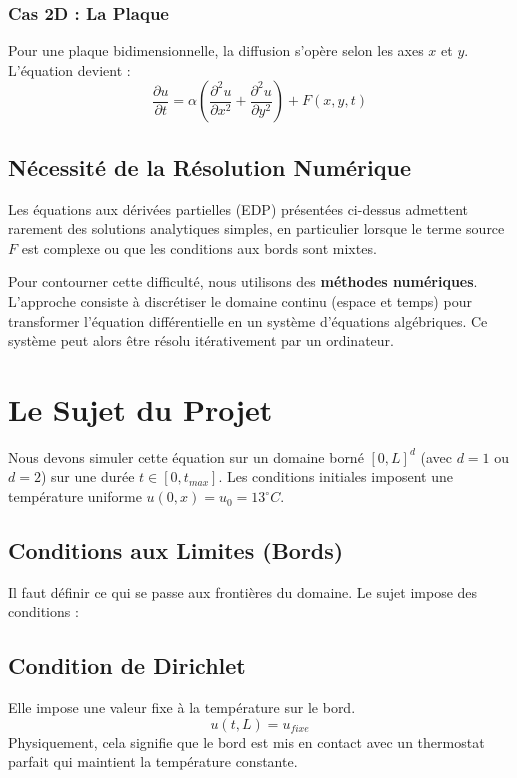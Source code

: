 \documentclass[a4paper,12pt]{article}
\begin{document}
\subsubsection{Cas 2D : La Plaque}
Pour une plaque bidimensionnelle, la diffusion s'opère selon les axes $x$ et $y$. L'équation devient :
\begin{equation}
    \frac{\partial u}{\partial t} = \alpha \left( \frac{\partial^2 u}{\partial x^2} + \frac{\partial^2 u}{\partial y^2} \right) + F(x,y,t)
\end{equation}

\subsection{Nécessité de la Résolution Numérique}
Les équations aux dérivées partielles (EDP) présentées ci-dessus admettent rarement des solutions analytiques simples, en particulier lorsque le terme source $F$ est complexe ou que les conditions aux bords sont mixtes.

Pour contourner cette difficulté, nous utilisons des \textbf{méthodes numériques}. L'approche consiste à discrétiser le domaine continu (espace et temps) pour transformer l'équation différentielle en un système d'équations algébriques. Ce système peut alors être résolu itérativement par un ordinateur.








\section{Le Sujet du Projet}
Nous devons simuler cette équation sur un domaine borné $[0, L]^d$ (avec $d=1$ ou $d=2$) sur une durée $t \in [0, t_{max}]$. 
Les conditions initiales imposent une température uniforme $u(0, x) = u_0 = 13^\circ C$.

\subsection{Conditions aux Limites (Bords)}
Il faut définir ce qui se passe aux frontières du domaine. Le sujet impose des conditions  :

\subsection{Condition de Dirichlet}
Elle impose une valeur fixe à la température sur le bord.
$$ u(t, L) = u_{fixe} $$
Physiquement, cela signifie que le bord est mis en contact avec un thermostat parfait qui maintient la température constante.
\end{document}
